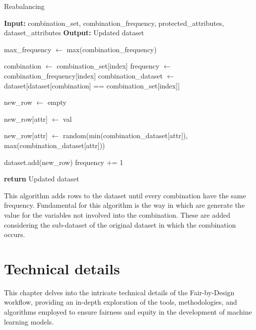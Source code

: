 \begin{algorithm}[H]
    \caption{Reabalancing}
    \begin{algorithmic}[1]
        \State \textbf{Input:} combination\_set, combination\_frequency, protected\_attributes, dataset\_attributes
        \State \textbf{Output:} Updated dataset

        \State max\_frequency $\gets$ max(combination\_frequency)

            \State combination $\gets$ combination\_set[index]
            \State frequency $\gets$ combination\_frequency[index]
            \State combination\_dataset $\gets$ dataset[dataset[combination] == combination\_set[index]]

                \State new\_row $\gets$ empty

                    \State new\_row[attr] $\gets$ val
                \EndFor

                    \State new\_row[attr] $\gets$ random(min(combination\_dataset[attr]), max(combination\_dataset[attr]))
                \EndFor

                \State dataset.add(new\_row)
                \State frequency $+$= 1
            \EndWhile
        \EndFor

        \State \textbf{return} Updated dataset
    \end{algorithmic}
\end{algorithm}

This algorithm adds rows to the dataset until every combination have the same frequency. Fundamental for this algorithm is the way in which are generate the value for the variables not involved into the combination. These are added considering the sub-dataset of the original dataset in which the combination occurs. 


\chapter{Technical details}
\label{chap:technical}

This chapter delves into the intricate technical details of the Fair-by-Design workflow, providing an in-depth exploration of the tools, methodologies, and algorithms employed to ensure fairness and equity in the development of machine learning models.

